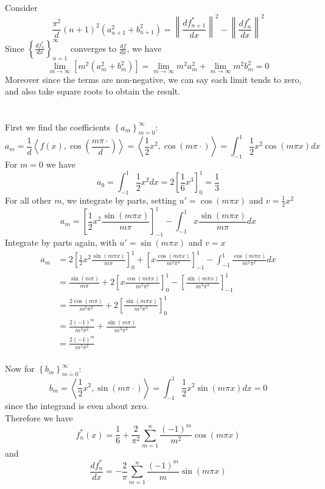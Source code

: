 \documentclass[12pt]{article}
\begin{document}
\section{}

Consider 
$$
\frac{\pi^2}{d}\left(n+1\right)^2\left(a_{n+1}^2+b_{n+1}^2\right) =
\left\|\frac{df_{n+1}^*}{dx}\right\|^2 - \left\|\frac{df_n^*}{dx}\right\|^2
$$
Since $\left\{\frac{df_n^*}{dx}\right\}_{n=1}^\infty$ converges to $\frac{df}{dx}$, we have 
$$
\lim_{m \rightarrow \infty}
\left[
m^2\left(a_m^2+b_m^2\right)
\right]
= \lim_{m \rightarrow \infty}m^2a_m^2 + 
\lim_{m \rightarrow \infty}m^2b_m^2
= 0
$$
Moreover since the terms are non-negative, we can say each limit tends to zero, and also take square roots to obtain the result.

\section{}

First we find the coefficients $\left\{a_m\right\}_{m=0}^\infty$:
$$
a_m=\frac{1}{d}\left\langle f(x),\cos\left(\frac{m\pi\cdot}{d}\right)\right\rangle =
\left\langle\frac{1}{2}x^2,\cos\left(m\pi\cdot\right)\right\rangle =
\int_{-1}^1 \frac{1}{2}x^2\cos\left(m\pi x\right)dx
$$
For $m=0$ we have
$$
a_0=\int_{-1}^1\frac{1}{2}x^2dx=2\left[\frac{1}{6}x^3\right]_0^1 = \frac{1}{3}
$$
For all other $m$, we integrate by parts, setting $u' = \cos\left(m\pi x\right)$ and $v=\frac{1}{2}x^2$
$$
a_m=\left[\frac{1}{2}x^2\frac{\sin\left(m\pi x\right)}{m\pi}\right]_{-1}^1 -
\int_{-1}^1 x\frac{\sin\left(m\pi x\right)}{m\pi}dx
$$
Integrate by parts again, with $u' = \sin\left(m\pi x\right)$ and $v = x$
\begin{align*}
a_m&=
2\left[\frac{1}{2}x^2\frac{\sin\left(m\pi x\right)}{m\pi}\right]_0^1 +
\left[x\frac{\cos\left(m\pi x\right)}{m^2\pi^2}\right]_{-1}^1 -
\int_{-1}^1\frac{\cos\left(m\pi x\right)}{m^2\pi^2}dx
\\&=
\frac{\sin\left(m\pi\right)}{m\pi} +
2\left[x\frac{\cos\left(m\pi x\right)}{m^2\pi^2}\right]_0^1 -
\left[\frac{\sin\left(m\pi x\right)}{m^3\pi^3}\right]_{-1}^1
\\&=
\frac{2\cos\left(m\pi\right)}{m^2\pi^2} +
2\left[\frac{\sin\left(m\pi x\right)}{m^3\pi^3}\right]_0^1
\\&=
\frac{2(-1)^m}{m^2\pi^2} +
\frac{\sin\left(m\pi\right)}{m^3\pi^3}
\\&= 
\frac{2(-1)^m}{m^2\pi^2}
\end{align*}
\\
Now for $\left\{b_m\right\}_{m=0}^\infty$:
$$
b_m=\left\langle\frac{1}{2}x^2,\sin\left(m\pi\cdot\right)\right\rangle =
\int_{-1}^1\frac{1}{2}x^2\sin\left(m\pi x\right)dx = 0
$$
since the integrand is even about zero.
\\
Therefore we have 
$$
f_n^*(x)=\frac{1}{6} + \frac{2}{\pi^2}\sum_{m=1}^n\frac{(-1)^m}{m^2}\cos(m\pi x) 
$$
and
$$
\frac{df_n^*}{dx}=-\frac{2}{\pi}\sum_{m=1}^n\frac{(-1)^m}{m}\sin(m\pi x)
$$
\end{document}
